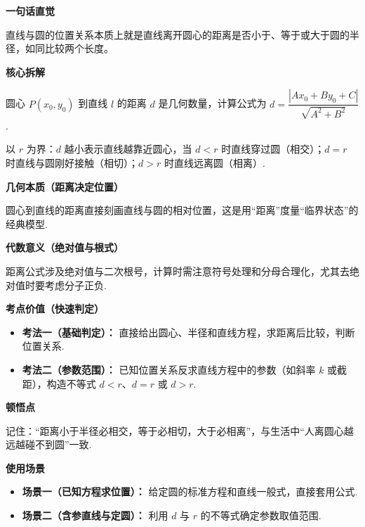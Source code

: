 \begin{explanationbox}
	\textbf{\textcolor{CExplanation}{一句话直觉}}

	直线与圆的位置关系本质上就是直线离开圆心的距离是否小于、等于或大于圆的半径，如同比较两个长度。

	\medskip
	\textbf{\textcolor{CExplanation}{核心拆解}}
	\begin{description}[style=nextline, leftmargin=2.8em, labelsep=0.5em, itemsep=0.45em]
		\item[\textbf{要点一（点到直线距离）：}] 圆心 $P(x_0,y_0)$ 到直线 $l$ 的距离 $d$ 是几何数量，计算公式为 $d = \dfrac{|Ax_0+By_0+C|}{\sqrt{A^2+B^2}}$.
		\item[\textbf{要点二（比较判据）：}] 以 $r$ 为界：$d$ 越小表示直线越靠近圆心，当 $d<r$ 时直线穿过圆（相交）；$d=r$ 时直线与圆刚好接触（相切）；$d>r$ 时直线远离圆（相离）.
	\end{description}

	\medskip
	\textbf{\textcolor{CExplanation}{几何本质（距离决定位置）}}

	圆心到直线的距离直接刻画直线与圆的相对位置，这是用“距离”度量“临界状态”的经典模型.

	\medskip
	\textbf{\textcolor{CExplanation}{代数意义（绝对值与根式）}}

	距离公式涉及绝对值与二次根号，计算时需注意符号处理和分母合理化，尤其去绝对值时要考虑分子正负.

	\medskip
	\textbf{\textcolor{CExplanation}{考点价值（快速判定）}}
	\begin{itemize}[leftmargin=*, itemsep=0.5em, topsep=0.4em]
		\item \textbf{考法一（基础判定）：} 直接给出圆心、半径和直线方程，求距离后比较，判断位置关系.
		\item \textbf{考法二（参数范围）：} 已知位置关系反求直线方程中的参数（如斜率 $k$ 或截距），构造不等式 $d<r$、$d=r$ 或 $d>r$.
	\end{itemize}

	\medskip
	\textbf{\textcolor{CExplanation}{顿悟点}}

	记住：“距离小于半径必相交，等于必相切，大于必相离”，与生活中“人离圆心越远越碰不到圆”一致.

	\medskip
	\textbf{\textcolor{CExplanation}{使用场景}}
	\begin{itemize}[leftmargin=*, itemsep=0.5em, topsep=0.4em]
		\item \textbf{场景一（已知方程求位置）：} 给定圆的标准方程和直线一般式，直接套用公式.
		\item \textbf{场景二（含参直线与定圆）：} 利用 $d$ 与 $r$ 的不等式确定参数取值范围.
	\end{itemize}
\end{explanationbox}
